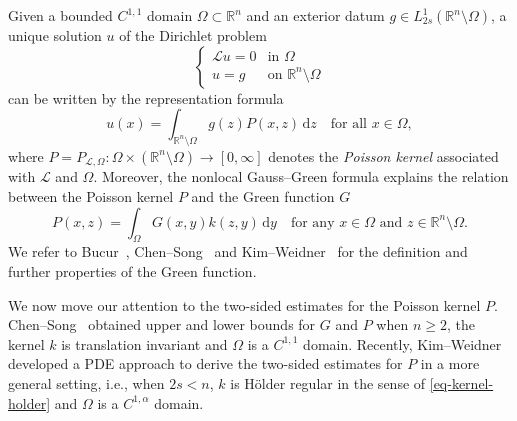 \documentclass[11pt]{amsart}
\theoremstyle{plain}
\theoremstyle{definition}
\numberwithin{equation}{section}
\begin{document}
Given a bounded $C^{1,1}$ domain $\Omega \subset \mathbb{R}^n$ and an exterior datum $g \in L^1_{2s}(\mathbb{R}^n \setminus \Omega)$, a unique solution $u$ of the Dirichlet problem 
\begin{equation*}
        \begin{cases}
            \mathcal{L}u=0 & \text{in $\Omega$}\\
            u=g & \text{on $\mathbb{R}^n \setminus \Omega$}
        \end{cases}
    \end{equation*}
    can be written by the representation formula
     \begin{equation*}
        u(x)=\int_{\mathbb{R}^n \setminus \Omega} g(z)P(x, z)\,\mathrm{d}z \quad \text{for all $x \in \Omega$},
    \end{equation*}
    where $P=P_{\mathcal{L}, \Omega}: \Omega \times (\mathbb{R}^n \setminus \Omega) \to [0, \infty]$ denotes the \emph{Poisson kernel} associated with $\mathcal{L}$ and $\Omega$. Moreover, the nonlocal Gauss--Green formula explains the relation between the Poisson kernel $P$ and the Green function $G$ 
    \begin{equation*}
        P(x, z)=\int_{\Omega}G(x, y)k(z, y)\,\mathrm{d}y \quad \text{for any $x \in \Omega$ and $z \in \mathbb{R}^n \setminus \Omega$}.
    \end{equation*}
    We refer to Bucur~\cite{Buc16}, Chen--Song~\cite{CS98} and Kim--Weidner~\cite{KW24b} for the definition and further properties of the Green function.

    We now move our attention to the two-sided estimates for the Poisson kernel $P$. Chen--Song~\cite[Theorem~1.5]{CS98} obtained upper and lower bounds for $G$ and $P$ when $n \geq 2$, the kernel $k$ is translation invariant and $\Omega$ is a $C^{1, 1}$ domain. Recently, Kim--Weidner~\cite[Corollary~9.6]{KW24b} developed a PDE approach to derive the two-sided estimates for $P$ in a more general setting, i.e., when $2s<n$, $k$ is H\"older regular in the sense of \eqref{eq-kernel-holder} and $\Omega$ is a $C^{1, \alpha}$ domain.
\end{document}
